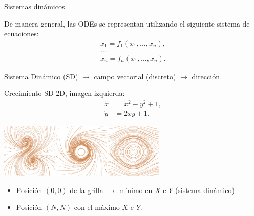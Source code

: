 \documentclass[spanish,unknownkeysallowed]{beamer}
\begin{document}
\begin{frame}{Sistemas dinámicos}

De manera general, las ODEs se representan utilizando el siguiente sistema de ecuaciones:
\begin{equation*}
  \begin{aligned}
    \dot{x_{1}} = f_{1}(x_{1},\ldots,x_{n}),\\
    \ldots\\
    \dot{x_{n}} = f_{n}(x_{1},\ldots,x_{n}).
  \end{aligned}
\end{equation*}






\vspace{0.1cm}

Sistema Dinámico (SD) $\rightarrow$ campo vectorial (discreto) $\rightarrow$ dirección

\vspace{0.1cm}

\end{frame}

\begin{frame}{Crecimiento}
SD 2D, imagen izquierda:
\begin{equation*} \label{eq:simple}  
  \begin{aligned}
    \dot{x} &= x^{2}-y^{2}+1,\\
    \dot{y} &= 2xy+1.
  \end{aligned}
\end{equation*}
  \centerline{\includegraphics[width=8cm]{../figures/Fig2}}


\begin{itemize}
\item Posición $(0,0)$ de la grilla $\rightarrow$ mínimo en $X$ e $Y$ (sistema dinámico)
\item Posición $(N,N)$ con el máximo $X$ e $Y$.
\end{itemize}

\end{frame}
\end{document}
